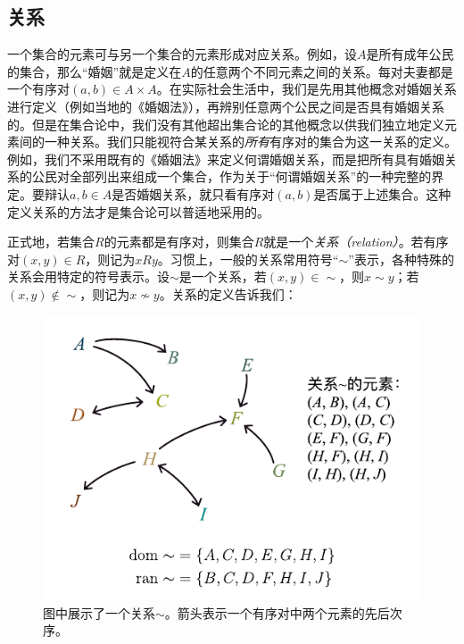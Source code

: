 \documentclass[../main.tex]{subfiles}
\begin{document}
\subsection{关系}
一个集合的元素可与另一个集合的元素形成对应关系。例如，设$A$是所有成年公民的集合，那么“婚姻”就是定义在$A$的任意两个不同元素之间的关系。每对夫妻都是一个有序对$\left(a,b\right)\in A\times A$。在实际社会生活中，我们是先用其他概念对婚姻关系进行定义（例如当地的《婚姻法》），再辨别任意两个公民之间是否具有婚姻关系的。但是在集合论中，我们没有其他超出集合论的其他概念以供我们独立地定义元素间的一种关系。我们只能视符合某关系的\emph{所有}有序对的集合为这一关系的定义。例如，我们不采用既有的《婚姻法》来定义何谓婚姻关系，而是把所有具有婚姻关系的公民对全部列出来组成一个集合，作为关于“何谓婚姻关系”的一种完整的界定。要辩认$a, b\in A$是否婚姻关系，就只看有序对$\left(a,b\right)$是否属于上述集合。这种定义关系的方法才是集合论可以普适地采用的。

正式地，若集合$R$的元素都是有序对，则集合$R$就是一个\emph{关系（relation）}。若有序对$\left(x,y\right)\in R$，则记为$xRy$。习惯上，一般的关系常用符号“$\sim$”表示，各种特殊的关系会用特定的符号表示。设$\sim$是一个关系，若$\left(x,y\right)\in \sim$，则$x\sim y$；若$\left(x,y\right)\notin\sim$，则记为$x\not\sim y$。关系的定义告诉我们：

\begin{figure}[htbp]
    \centering
    \includegraphics{../images/relation.pdf}
    \caption{图中展示了一个关系$\sim$。箭头表示一个有序对中两个元素的先后次序。}
    \label{fig:II.1.1}
\end{figure}
\end{document}

